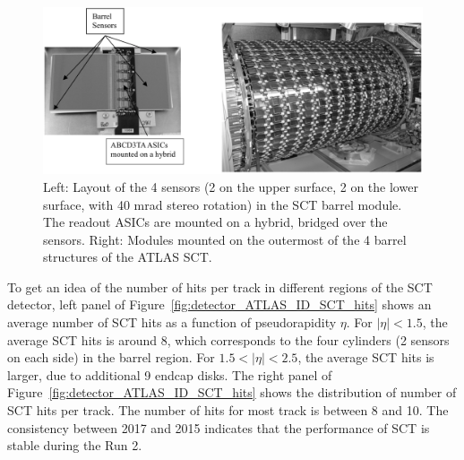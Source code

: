 \begin{figure}[H]
\centering
\includegraphics[width=.95\linewidth]{figs/chapter_detector/ATLAS_ID_SCT.png}
\caption{Left: Layout of the 4 sensors (2 on the upper surface, 2 on the lower surface, with 40 mrad stereo rotation) in the SCT barrel module. The readout ASICs are mounted on a hybrid, bridged over the sensors. Right: Modules mounted on the outermost of the 4 barrel structures of the ATLAS SCT.}
\label{fig:detector_ATLAS_ID_SCT}
\end{figure}

To get an idea of the number of hits per track in different regions of the SCT detector, left panel of Figure~\ref{fig:detector_ATLAS_ID_SCT_hits} shows an average number of SCT hits as a function of pseudorapidity $\eta$. For $|\eta|<1.5$, the average SCT hits is around 8, which corresponds to the four cylinders (2 sensors on each side) in the barrel region. For $1.5<|\eta|<2.5$, the average SCT hits is larger, due to additional 9 endcap disks. The right panel of Figure~\ref{fig:detector_ATLAS_ID_SCT_hits} shows the distribution of number of SCT hits per track. The number of hits for most track is between 8 and 10. The consistency between 2017 and 2015 indicates that the performance of SCT is stable during the Run 2.


